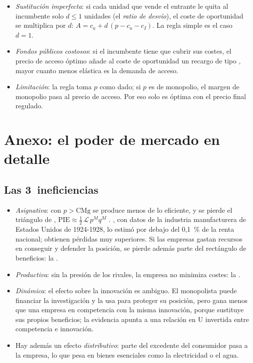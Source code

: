 \documentclass[11pt]{article}
\begin{document}
\begin{itemize}
\item \emph{Sustitución imperfecta}: si cada unidad que vende el entrante le quita al incumbente solo $d\leq 1$ unidades (el \emph{ratio de desvío}), el coste de oportunidad se multiplica por $d$: $A=c_a+d\,(p-c_a-c_I)$\nocite{ArmstrongDoyleVickers1996Access}. La regla simple es el caso $d=1$.
\item \emph{Fondos públicos costosos}: si el incumbente tiene que cubrir sus costes, el precio de acceso óptimo añade al coste de oportunidad un recargo de tipo , mayor cuanto menos elástica es la demanda de acceso\nocite{ArmstrongDoyleVickers1996Access}.
\item \emph{Limitación}: la regla toma $p$ como dado; si $p$ es de monopolio, el margen de monopolio pasa al precio de acceso. Por eso solo es óptima con el precio final regulado.\findemo
\end{itemize}

\section{Anexo: el poder de mercado en detalle}\label{anexo:poder-mercado-detalle}

\subsection{Las 3~ineficiencias}\label{anexo:ineficiencias}

\begin{itemize}
\item \emph{Asignativa}: con $p>\mathrm{CMg}$ se produce menos de lo eficiente, y se pierde el triángulo de \textcite{Harberger1954Monopoly}, $\mathrm{PIE}\approx\tfrac12\,\mathcal{L}\,p^Mq^M$ . , con datos de la industria manufacturera de Estados Unidos de 1924-1928, lo estimó por debajo del 0,1~\% de la renta nacional\nocite{Schmitz2012New}; \textcite{CowlingMueller1978Social} obtienen pérdidas muy superiores. Si las empresas gastan recursos en conseguir y defender la posición, se pierde además parte del rectángulo de beneficios: la \nocite{Tullock1967Welfare,Posner1975Social}.
\item \emph{Productiva}: sin la presión de los rivales, la empresa no minimiza costes: la \nocite{Leibenstein1966Allocative} .
\item \emph{Dinámica}: el efecto sobre la innovación es ambiguo. El monopolista puede financiar la investigación y la usa para proteger su posición\nocite{Schumpeter1942Capitalism}, pero gana menos que una empresa en competencia con la misma innovación, porque sustituye sus propios beneficios\nocite{Arrow1962Economic}; la evidencia apunta a una relación en U invertida entre competencia e innovación\nocite{AghionEtAl2005Competition}.
\item Hay además un efecto \emph{distributivo}: parte del excedente del consumidor pasa a la empresa, lo que pesa en bienes esenciales como la electricidad o el agua.
\end{itemize}
\end{document}
